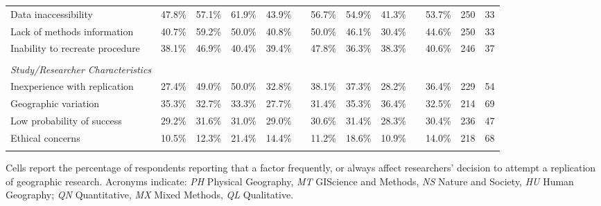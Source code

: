 \documentclass[]{interact}
\theoremstyle{plain}%
\theoremstyle{definition}
\theoremstyle{remark}
\begin{document}
\begin{landscape}
\begin{table}[h]
\begin{threeparttable}
\begin{tabular}{l c c c c c c c c c c c c}
         Data inaccessibility               & 47.8\% & 57.1\% & 61.9\% & 43.9\% & & 56.7\% & 54.9\% & 41.3\% & & 53.7\% & 250 & 33 \\
         Lack of methods information        & 40.7\% & 59.2\% & 50.0\% & 40.8\% & & 50.0\% & 46.1\% & 30.4\% & & 44.6\% & 250 & 33 \\
         Inability to recreate procedure    & 38.1\% & 46.9\% & 40.4\% & 39.4\% & & 47.8\% & 36.3\% & 38.3\% & & 40.6\% & 246 & 37 \\
                                            & & & & & & & & & & & & \\
         \textit{Study/Researcher Characteristics}     & & & & & & & & & & & & \\
         Inexperience with replication      & 27.4\% & 49.0\% & 50.0\% & 32.8\% & & 38.1\% & 37.3\% & 28.2\% & & 36.4\% & 229 & 54 \\
         Geographic variation               & 35.3\% & 32.7\% & 33.3\% & 27.7\% & & 31.4\% & 35.3\% & 36.4\% & & 32.5\% & 214 & 69 \\
         Low probability of success         & 29.2\% & 31.6\% & 31.0\% & 29.0\% & & 30.6\% & 31.4\% & 28.3\% & & 30.4\% & 236 & 47 \\
         Ethical concerns                   & 10.5\% & 12.3\% & 21.4\% & 14.4\% & & 11.2\% & 18.6\% & 10.9\% & & 14.0\% & 218 & 68 \\
                                            & & & & & & & & & & & & \\
        \hline
    \end{tabular}
    \begin{tablenotes}
        \footnotesize
        \item Cells report the percentage of respondents reporting that a factor frequently, or always affect researchers' decision to attempt a replication of geographic research. Acronyms indicate: \textit{PH} Physical Geography, \textit{MT} GIScience and Methods, \textit{NS} Nature and Society, \textit{HU} Human Geography; \textit{QN} Quantitative, \textit{MX} Mixed Methods, \textit{QL} Qualitative. 
    \end{tablenotes}
    \label{tab:motivations}
    \end{threeparttable}
\end{table}
\end{landscape}

\newpage
\end{document}
